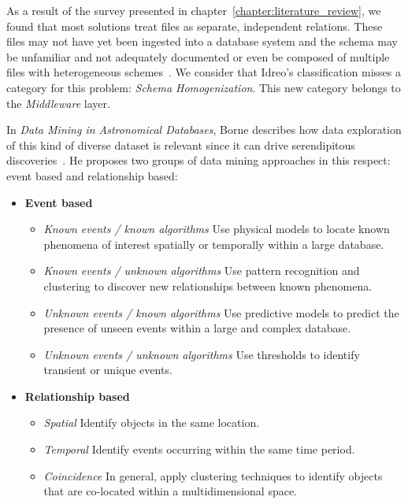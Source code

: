 
As a result of the survey presented in chapter~\ref{chapter:literature_review},
we found that most solutions treat files
as separate, independent relations.
These files may not have yet been ingested into a database system and 
the schema may be unfamiliar and not adequately documented or even be
composed of multiple files with heterogeneous schemes~\cite{alawini2016,zhang2015astronomy}.
We consider that Idreo's classification misses a category for this problem:
\emph{Schema Homogenization}. This new category belongs to the \emph{Middleware} layer.

In \emph{Data Mining in Astronomical Databases}, Borne
describes how data exploration of this kind of diverse dataset is
relevant since it can drive serendipitous discoveries~\cite{Borne2001}. He proposes
two groups of data mining approaches in this respect: event
based and relationship based:

\begin{itemize}
    \item \textbf{Event based}
        \begin{itemize}
          \item \emph{Known events / known algorithms}
            Use physical models to locate known phenomena of interest spatially
            or temporally within a large database.
          \item \emph{Known events / unknown algorithms}
            Use pattern recognition and clustering to discover new relationships between known
            phenomena.
          \item \emph{Unknown events / known algorithms}
            Use predictive models to predict the presence of unseen events within a
            large and complex database.
          \item \emph{Unknown events / unknown algorithms}
            Use thresholds to identify transient or unique events.
        \end{itemize}

    \item \textbf{Relationship based}
        \begin{itemize}
            \item \emph{Spatial}
                Identify objects in the same location.
            \item \emph{Temporal}
                Identify events occurring within the same time period.
            \item \emph{Coincidence}
                In general, apply clustering techniques to
                identify objects that are co-located within a multidimensional space.
        \end{itemize}
\end{itemize}

